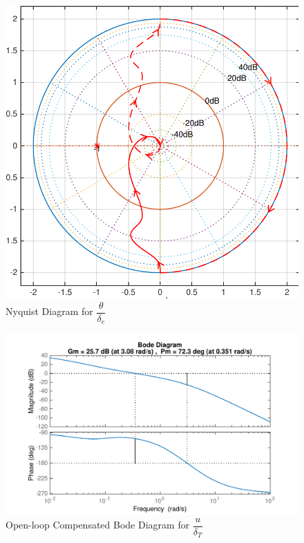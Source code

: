\documentclass[11pt]{article}
\begin{document}
\begin{figure}[h!]
\begin{center}
\includegraphics[height=.4\textheight]{figures/nyquist_u}
\caption{Nyquist Diagram for $\dfrac{\theta}{\delta_e}$}
\end{center}
\end{figure}

\begin{figure}[h!]
\begin{center}
\includegraphics[height=.4\textheight]{figures/open_comp_u}
\caption{Open-loop Compensated Bode Diagram for $\dfrac{u}{\delta_T}$}
\end{center}
\end{figure}
\end{document}
